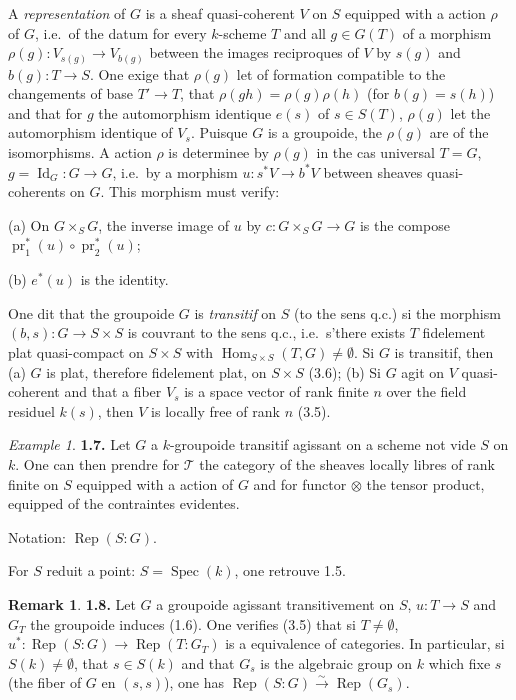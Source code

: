 \documentclass[12pt,a4paper]{article}
\theoremstyle{plain}
\theoremstyle{definition}
\newtheorem{remark}[theorem]{Remark}
\theoremstyle{remark}
\newtheorem{example}[theorem]{Example}
\DeclareMathOperator{\Hom}{Hom}
\DeclareMathOperator{\Spec}{Spec}
\DeclareMathOperator{\Id}{Id}
\DeclareMathOperator{\pr}{pr}
\DeclareMathOperator{\Rep}{Rep}
\begin{document}
A \emph{representation} of $G$ is a sheaf quasi-coherent $V$ on $S$ equipped with a action $\rho$ of $G$, i.e.~of the datum for every $k$-scheme $T$ and all $g \in G(T)$ of a morphism $\rho(g) : V_{s(g)} \to V_{b(g)}$ between the images reciproques of $V$ by $s(g)$ and $b(g) : T \to S$. One exige that $\rho(g)$ let of formation compatible to the changements of base $T' \to T$, that $\rho(gh) = \rho(g)\rho(h)$ (for $b(g) = s(h)$) and that for $g$ the automorphism identique $e(s)$ of $s \in S(T)$, $\rho(g)$ let the automorphism identique of $V_s$. Puisque $G$ is a groupoide, the $\rho(g)$ are of the isomorphisms. A action $\rho$ is determinee by $\rho(g)$ in the cas universal $T = G$, $g = \Id_G : G \to G$, i.e.~by a morphism $u : s^*V \to b^*V$ between sheaves quasi-coherents on $G$. This morphism must verify:

(a) On $G \times_S G$, the inverse image of $u$ by $c : G \times_S G \to G$ is the compose $\pr_1^*(u) \circ \pr_2^*(u)$;

(b) $e^*(u)$ is the identity.

One dit that the groupoide $G$ is \emph{transitif} on $S$ (to the sens q.c.) si the morphism $(b,s) : G \to S \times S$ is couvrant to the sens q.c., i.e.~s'there exists $T$ fidelement plat quasi-compact on $S \times S$ with $\Hom_{S \times S}(T,G) \neq \emptyset$. Si $G$ is transitif, then (a) $G$ is plat, therefore fidelement plat, on $S \times S$ (3.6); (b) Si $G$ agit on $V$ quasi-coherent and that a fiber $V_s$ is a space vector of rank finite $n$ over the field residuel $k(s)$, then $V$ is locally free of rank $n$ (3.5).

\begin{example}
\textbf{1.7.} Let $G$ a $k$-groupoide transitif agissant on a scheme not vide $S$ on $k$. One can then prendre for $\mathcal{T}$ the category of the sheaves locally libres of rank finite on $S$ equipped with a action of $G$ and for functor $\otimes$ the tensor product, equipped of the contraintes evidentes.

Notation: $\Rep(S:G)$.

For $S$ reduit a point: $S = \Spec(k)$, one retrouve 1.5.
\end{example}

\begin{remark}
\textbf{1.8.} Let $G$ a groupoide agissant transitivement on $S$, $u : T \to S$ and $G_T$ the groupoide induces (1.6). One verifies (3.5) that si $T \neq \emptyset$, $u^* : \Rep(S:G) \to \Rep(T:G_T)$ is a equivalence of categories. In particular, si $S(k) \neq \emptyset$, that $s \in S(k)$ and that $G_s$ is the algebraic group on $k$ which fixe $s$ (the fiber of $G$ en $(s,s)$), one has $\Rep(S:G) \xrightarrow{\sim} \Rep(G_s)$.
\end{remark}
\end{document}

